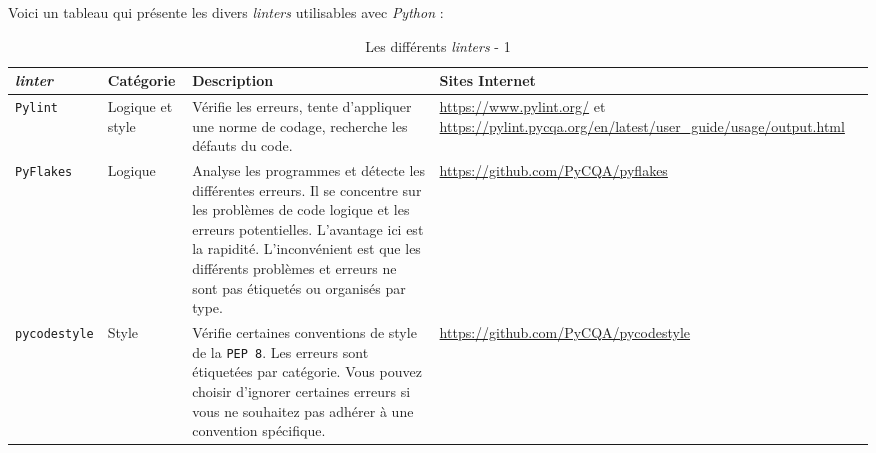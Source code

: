 \documentclass[a4paper,11pt]{book}
\begin{document}
Voici un tableau qui présente les divers \textit{linters} utilisables avec \textit{Python} :
\begin{table}[h]
\begin{center}
\begin{tabular}{|p{2.2cm}|p{1.8cm}|p{4.2cm}|p{5cm}|}
\hline
\textbf{\textit{linter}} & \textbf{Catégorie} & \textbf{Description} & \textbf{Sites Internet} \\
\hline 
\texttt{Pylint} & Logique et style & Vérifie les erreurs, tente d'appliquer une norme de codage, recherche les défauts du code. & \url{https://www.pylint.org/} et \url{https://pylint.pycqa.org/en/latest/user_guide/usage/output.html} \\
\hline
\texttt{PyFlakes} & Logique & Analyse les programmes et détecte les différentes erreurs. Il se concentre sur les problèmes de code logique et les erreurs potentielles. L'avantage ici est la rapidité. L'inconvénient est que les différents problèmes et erreurs ne sont pas étiquetés ou organisés par type. & \url{https://github.com/PyCQA/pyflakes} \\
\hline
\texttt{pycodestyle} & Style & Vérifie certaines conventions de style de la \texttt{PEP 8}. Les erreurs sont étiquetées par catégorie. Vous pouvez choisir d'ignorer certaines erreurs si vous ne souhaitez pas adhérer à une convention spécifique. & \url{https://github.com/PyCQA/pycodestyle} \\
\hline
\end{tabular}
\caption{Les différents \textit{linters} - 1} 
\end{center}
\end{table}
\newpage
\end{document}
